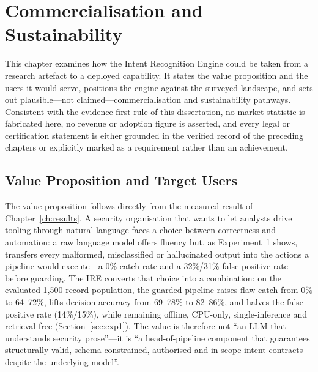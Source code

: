 
\chapter{Commercialisation and Sustainability}\label{ch:commercialisation}

This chapter examines how the Intent Recognition Engine could be taken from a
research artefact to a deployed capability. It states the value proposition and
the users it would serve, positions the engine against the surveyed landscape,
and sets out plausible---not claimed---commercialisation and sustainability
pathways. Consistent with the evidence-first rule of this dissertation, no
market statistic is fabricated here, no revenue or adoption figure is asserted,
and every legal or certification statement is either grounded in the verified
record of the preceding chapters or explicitly marked as a requirement rather
than an achievement.

\section{Value Proposition and Target Users}\label{sec:value-proposition}

The value proposition follows directly from the measured result of
Chapter~\ref{ch:results}. A security organisation that wants to let analysts
drive tooling through natural language faces a choice between correctness and
automation: a raw language model offers fluency but, as Experiment~1 shows,
transfers every malformed, misclassified or hallucinated output into the actions
a pipeline would execute---a 0\% catch rate and a 32\%/31\% false-positive
rate before guarding. The IRE converts that choice into a combination: on the
evaluated 1,500-record population, the guarded pipeline raises flaw catch from
0\% to 64--72\%, lifts decision accuracy from 69--78\% to 82--86\%, and halves
the false-positive rate (14\%/15\%), while remaining offline, CPU-only,
single-inference and retrieval-free
(Section~\ref{sec:exp1}). The value is therefore not ``an LLM that understands
security prose''---it is ``a head-of-pipeline component that guarantees
structurally valid, schema-constrained, authorised and in-scope intent
contracts despite the underlying model''.

